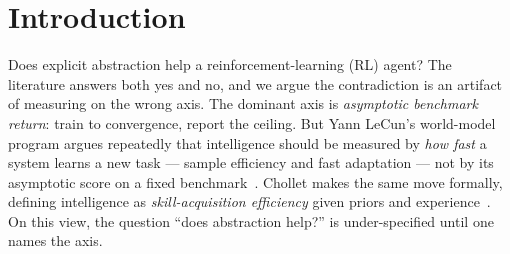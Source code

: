 \documentclass{article}
\begin{document}
\begin{abstract}
predicate), whereas the \emph{learned/generative} arm LeCun bets on sits flat at
$0.0$ --- a NULL that holds under a corrected critic and a feasible Cartesian
(OSC) action, and that a rigorous deterministic positive control (a $4$-arm,
$8$-seed long-horizon navigation task) cleanly attributes to the unlearnable
sub-centimeter contact primitive rather than to a broken hierarchy: the same
2-level H-JEPA machinery reliably reaches the raw-observation ceiling on nav
($0.941 \pm 0.137$ vs.\ flat $0.971 \pm 0.048$; this number supersedes an earlier
retracted, non-reproducible run --- see provenance
caveat in \S\ref{sec:results-hier}). Every
abstraction lever we tested
buys \emph{speed} (or budget-bounded \emph{escape}), not asymptotic
\emph{capacity}, and the only hierarchy that buys competence on PandaPickCube is
the one with an \emph{injected} low-level primitive. We position this inside the
energy-based / anti-collapse framing and a structural-entropy surrogate motivated
by the formal impossibility of certifying mutual information from samples.
\end{abstract}

\section{Introduction}
\label{sec:intro}

Does explicit abstraction help a reinforcement-learning (RL) agent? The
literature answers both yes and no, and we argue the contradiction is an artifact
of measuring on the wrong axis. The dominant axis is \emph{asymptotic benchmark
return}: train to convergence, report the ceiling. But Yann LeCun's world-model
program argues repeatedly that intelligence should be measured by \emph{how fast}
a system learns a new task --- sample efficiency and fast adaptation --- not by
its asymptotic score on a fixed benchmark~\citep{lecun2022path}. Chollet makes
the same move formally, defining intelligence as \emph{skill-acquisition
efficiency} given priors and experience~\citep{chollet2019measure}. On this view,
the question ``does abstraction help?'' is under-specified until one names the
axis.
\end{document}
